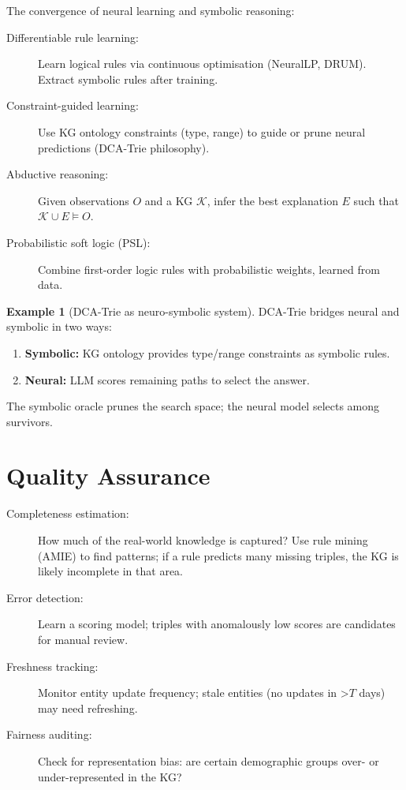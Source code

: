 \documentclass[11pt,a4paper,oneside,openany]{book}
\theoremstyle{definition}
\newtheorem{example}{Example}[chapter]
\theoremstyle{plain}
\theoremstyle{remark}
\newcommand{\kg}{\mathcal{K}}
\begin{document}
The convergence of neural learning and symbolic reasoning:

\begin{description}
	\item[Differentiable rule learning:] Learn logical rules via continuous optimisation (NeuralLP, DRUM). Extract symbolic rules after training.
	\item[Constraint-guided learning:] Use KG ontology constraints (type, range) to guide or prune neural predictions (DCA-Trie philosophy).
	\item[Abductive reasoning:] Given observations $O$ and a KG $\kg$, infer the best explanation $E$ such that $\kg \cup E \models O$.
	\item[Probabilistic soft logic (PSL):] Combine first-order logic rules with probabilistic weights, learned from data.
\end{description}

\begin{example}[DCA-Trie as neuro-symbolic system]
	DCA-Trie bridges neural and symbolic in two ways:
	\begin{enumerate}
		\item \textbf{Symbolic:} KG ontology provides type/range constraints as symbolic rules.
		\item \textbf{Neural:} LLM scores remaining paths to select the answer.
	\end{enumerate}
	The symbolic oracle prunes the search space; the neural model selects among survivors.
\end{example}

\section{Quality Assurance}\label{sec:qa-advanced}

\begin{description}
	\item[Completeness estimation:] How much of the real-world knowledge is captured? Use rule mining (AMIE) to find patterns; if a rule predicts many missing triples, the KG is likely incomplete in that area.
	\item[Error detection:] Learn a scoring model; triples with anomalously low scores are candidates for manual review.
	\item[Freshness tracking:] Monitor entity update frequency; stale entities (no updates in >$T$ days) may need refreshing.
	\item[Fairness auditing:] Check for representation bias: are certain demographic groups over- or under-represented in the KG?
\end{description}
\end{document}
